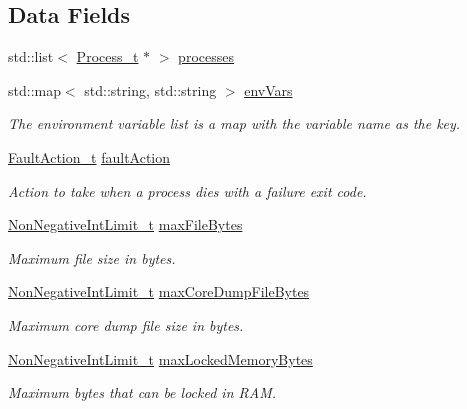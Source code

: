 \subsection*{Data Fields}
\begin{DoxyCompactItemize}
\item 
std\+::list$<$ \hyperlink{structmodel_1_1_process__t}{Process\+\_\+t} $\ast$ $>$ \hyperlink{structmodel_1_1_process_env__t_aaf3939d50131cc261c01599ed6ba15f8}{processes}
\item 
std\+::map$<$ std\+::string, std\+::string $>$ \hyperlink{structmodel_1_1_process_env__t_a66614cecb7ca5a8d65f00b9ac7baea33}{env\+Vars}
\begin{DoxyCompactList}\small\item\em The environment variable list is a map with the variable name as the key. \end{DoxyCompactList}\item 
\hyperlink{classmodel_1_1_fault_action__t}{Fault\+Action\+\_\+t} \hyperlink{structmodel_1_1_process_env__t_a8e9af93f8d44d2d8a1385e681021238f}{fault\+Action}
\begin{DoxyCompactList}\small\item\em Action to take when a process dies with a failure exit code. \end{DoxyCompactList}\item 
\hyperlink{classmodel_1_1_non_negative_int_limit__t}{Non\+Negative\+Int\+Limit\+\_\+t} \hyperlink{structmodel_1_1_process_env__t_a11139dc4c175dc5e1c2cf91a7a248949}{max\+File\+Bytes}
\begin{DoxyCompactList}\small\item\em Maximum file size in bytes. \end{DoxyCompactList}\item 
\hyperlink{classmodel_1_1_non_negative_int_limit__t}{Non\+Negative\+Int\+Limit\+\_\+t} \hyperlink{structmodel_1_1_process_env__t_a00d402d603b89ce5d4319f3e3504aa5d}{max\+Core\+Dump\+File\+Bytes}
\begin{DoxyCompactList}\small\item\em Maximum core dump file size in bytes. \end{DoxyCompactList}\item 
\hyperlink{classmodel_1_1_non_negative_int_limit__t}{Non\+Negative\+Int\+Limit\+\_\+t} \hyperlink{structmodel_1_1_process_env__t_af7dc3709b231cd34a1a066bff64b296c}{max\+Locked\+Memory\+Bytes}
\begin{DoxyCompactList}\small\item\em Maximum bytes that can be locked in R\+AM. \end{DoxyCompactList}\item 

\end{DoxyCompactItemize}
